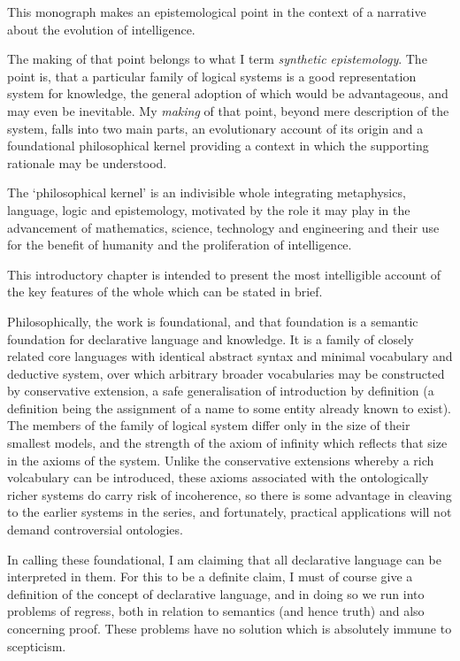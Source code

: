 
This monograph makes an epistemological point in the context of a narrative about the evolution of intelligence.

The making of that point belongs to what I term \emph{synthetic epistemology}.
The point is, that a particular family of logical systems is a good representation system for knowledge, the general adoption of which would be advantageous, and may even be inevitable.
My \emph{making} of that point, beyond mere description of the system, falls into two main parts, an evolutionary account of its origin and a foundational philosophical kernel providing a context in which the supporting rationale may be understood.

The `philosophical kernel' is an indivisible whole integrating metaphysics, language, logic and epistemology, motivated by the role it may play in the advancement of mathematics, science, technology and engineering and their use for the benefit of humanity and the proliferation of intelligence.

This introductory chapter is intended to present the most intelligible account of the key features of the whole which can be stated in brief.

Philosophically, the work is foundational, and that foundation is a semantic foundation for declarative language and knowledge.
It is a family of closely related core languages with identical abstract syntax and minimal vocabulary and deductive system, over which arbitrary broader vocabularies may be constructed by conservative extension, a safe generalisation of introduction by definition (a definition being the assignment of a name to some entity already known to exist).
The members of the family of logical system differ only in the size of their smallest models, and the strength of the axiom of infinity which reflects that size in the axioms of the system.
Unlike the conservative extensions whereby a rich volcabulary can be introduced, these axioms associated with the ontologically richer systems do carry risk of incoherence, so there is some advantage in cleaving to the earlier systems in the series, and fortunately, practical applications will not demand controversial ontologies.

In calling these foundational, I am claiming that all declarative language can be interpreted in them.
For this to be a definite claim, I must of course give a definition of the concept of declarative language, and in doing so we run into problems of regress, both in relation to semantics (and hence truth) and also concerning proof.
These problems have no solution which is absolutely immune to scepticism.


